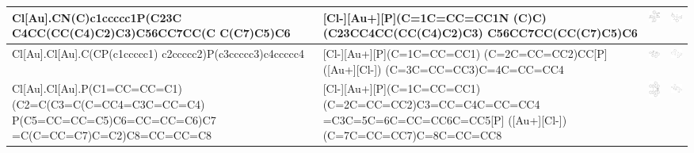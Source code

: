\begin{landscape}
\begin{longtable}{m{7cm}m{8cm}m{2.3cm}m{2.3cm}}
 Cl[Au].CN(C)c1ccccc1P(C23C C4CC(CC(C4)C2)C3)C56CC7CC(C C(C7)C5)C6 & 
 [Cl-][Au+][P](C=1C=CC=CC1N (C)C)(C23CC4CC(CC(C4)C2)C3) C56CC7CC(CC(C7)C5)C6 & 
 \includegraphics[width=2.2cm]{imagenes/sigmaAldrich/Chloro[di(1-adamantyl)-2-dimethylaminophenylphosphine]gold(I).png} & 
 \includegraphics[width=2.2cm]{imagenes/sciFinder/pdf/Chloro[di(1-adamantyl)-2-dimethylaminophenylphosphine]gold(I).pdf} \\
\hline





 Cl[Au].Cl[Au].C(CP(c1ccccc1) c2ccccc2)P(c3ccccc3)c4ccccc4 & 
 [Cl-][Au+][P](C=1C=CC=CC1) (C=2C=CC=CC2)CC[P]([Au+][Cl-]) (C=3C=CC=CC3)C=4C=CC=CC4 & 
 \includegraphics[width=2.2cm]{imagenes/sigmaAldrich/Dichloro(DPPE)digold(I).jpeg} & 
 \includegraphics[width=2.2cm]{imagenes/sciFinder/pdf/Dichloro(DPPE)digold(I).pdf} \\
\hline


 Cl[Au].Cl[Au].P(C1=CC=CC=C1) (C2=C(C3=C(C=CC4=C3C=CC=C4) P(C5=CC=CC=C5)C6=CC=CC=C6)C7 =C(C=CC=C7)C=C2)C8=CC=CC=C8 & 
 [Cl-][Au+][P](C=1C=CC=CC1) (C=2C=CC=CC2)C3=CC=C4C=CC=CC4 =C3C=5C=6C=CC=CC6C=CC5[P] ([Au+][Cl-])(C=7C=CC=CC7)C=8C=CC=CC8 & 
 \includegraphics[width=2.2cm]{imagenes/sigmaAldrich/Dichloro[(±)−BINAP]digold(I).png} & 
 \includegraphics[width=2.2cm]{imagenes/sciFinder/pdf/Dichloro[(±)−BINAP]digold(I).pdf} \\
\hline



\end{longtable}
\end{landscape}
